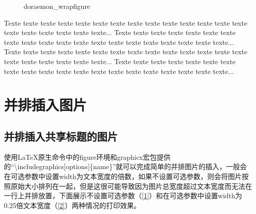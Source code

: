 \documentclass{article}
\begin{document}
    \begin{figure}%
        \centering
        \caption{doraemon\_wrapfigure}
    \end{figure}

    Texte texte texte texte texte texte texte
    texte texte texte texte texte texte texte
    texte texte texte texte texte texte...
    Texte texte texte texte texte texte texte
    texte texte texte texte texte texte texte
    texte texte texte texte texte texte...
    Texte texte texte texte texte texte texte
    texte texte texte texte texte texte texte
    texte texte texte texte texte texte...
    Texte texte texte texte texte texte texte
    texte texte texte texte texte texte texte
    texte texte texte texte texte texte...

\section{并排插入图片}
\subsection{并排插入共享标题的图片}
    使用\LaTeX 原生命令中的figure环境和graphicx宏包提供的``\textbackslash includegraphics[options]\{name\}''就可以完成简单的并排图片的插入，一般会在可选参数中设置width为文本宽度的倍数，如果不设置可选参数，则会将图片按照原始大小排列在一起，但是这很可能导致因为图片总宽度超过文本宽度而无法在一行上并排放置，下面展示不设置可选参数（\ref{1}）和在可选参数中设置width为0.25倍文本宽度（\ref{2}）两种情况的打印效果。
\end{document}
